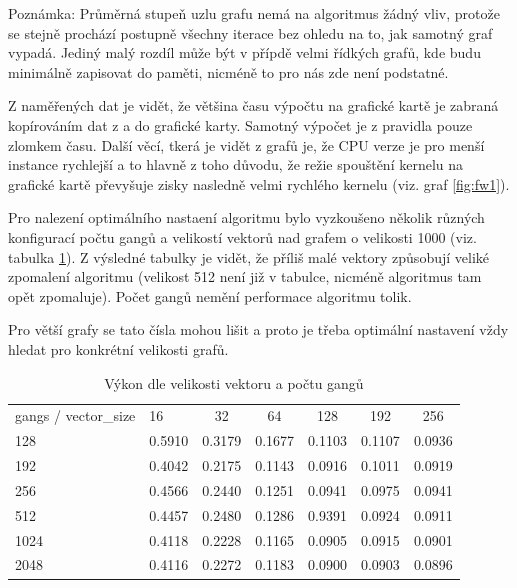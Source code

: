 \documentclass[11pt, fleqn]{article}
\begin{document}
Poznámka: Průměrná stupeň uzlu grafu nemá na algoritmus žádný vliv, protože se stejně prochází postupně všechny iterace bez ohledu na to, jak samotný graf vypadá. Jediný malý rozdíl může být v přípdě velmi řídkých grafů, kde budu minimálně zapisovat do paměti, nicméně to pro nás zde není podstatné.

Z naměřených dat je vidět, že většina času výpočtu na grafické kartě je zabraná kopírováním dat z a do grafické karty. Samotný výpočet je z pravidla pouze zlomkem času. Další věcí, tkerá je vidět z grafů je, že CPU verze je pro menší instance rychlejší a to hlavně z toho důvodu, že režie spouštění kernelu na grafické kartě převyšuje zisky nasledně velmi rychlého kernelu (viz. graf \ref{fig:fw1}).

Pro nalezení optimálního nastaení algoritmu bylo vyzkoušeno několik různých konfigurací počtu gangů a velikostí vektorů nad grafem o velikosti 1000 (viz. tabulka \ref{fig:fw2}). Z výsledné tabulky je vidět, že příliš malé vektory způsobují veliké zpomalení algoritmu (velikost 512 není již v tabulce, nicméně algoritmus tam opět zpomaluje). Počet gangů nemění performace algoritmu tolik.

Pro větší grafy se tato čísla mohou lišit a proto je třeba optimální nastavení vždy hledat pro konkrétní velikosti grafů.

\begin{table}[tbp]
  \centering
  \caption{Výkon dle velikosti vektoru a počtu gangů}
  \label{fig:fw2}
  \def\arraystretch{2}
  \begin{tabular}{llccccc}
    gangs / vector\_size & 16 & 32 & 64 & 128 & 192 & 256 \\
    \rowcolor[HTML]{ECF4FF} 
    128  & 0.5910 & 0.3179 & 0.1677 & 0.1103 & 0.1107 & 0.0936 \\
    192  & 0.4042 & 0.2175 & 0.1143 & 0.0916 & 0.1011 & 0.0919 \\
    \rowcolor[HTML]{ECF4FF} 
    256  & 0.4566 & 0.2440 & 0.1251 & 0.0941 & 0.0975 & 0.0941 \\
    512  & 0.4457 & 0.2480 & 0.1286 & 0.9391 & 0.0924 & 0.0911 \\
    \rowcolor[HTML]{ECF4FF} 
    1024 & 0.4118 & 0.2228 & 0.1165 & 0.0905 & 0.0915 & 0.0901 \\
    2048 & 0.4116 & 0.2272 & 0.1183 & 0.0900 & 0.0903 & 0.0896
  \end{tabular}
\end{table}
\end{document}
